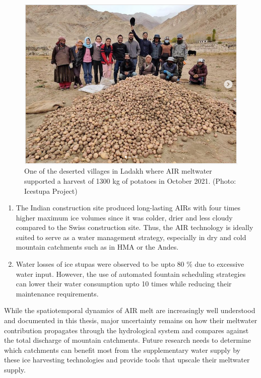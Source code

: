 \begin{figure}[htb]
  \centering
	\includegraphics[width=8 cm]{figs/Kullum_potatoes}
	\caption{One of the deserted villages in Ladakh where AIR meltwater supported a harvest of 1300 kg of
		potatoes in October 2021. (Photo: Icestupa Project)}
	\label{fig:kullum_potatoes}
\end{figure}

\begin{enumerate}

  \item The Indian construction site produced long-lasting \ac{AIRs} with four times higher maximum ice volumes
    since it was colder, drier and less cloudy compared to the Swiss construction site. Thus, the \ac{AIR}
    technology is ideally suited to serve as a water management strategy, especially in dry and cold mountain
    catchments such as in \ac{HMA} or the Andes.

  \item Water losses of ice stupas were observed to be upto 80 \% due to excessive water input. However, the use
    of automated fountain scheduling strategies can lower their water consumption upto 10 times while reducing
    their maintenance requirements.

\end{enumerate}

While the spatiotemporal dynamics of AIR melt are increasingly well understood and documented in this thesis,
major uncertainty remains on how their meltwater contribution propagates through the hydrological system and
compares against the total discharge of mountain catchments. Future research needs to determine which catchments
can benefit most from the supplementary water supply by these ice harvesting technologies and provide tools that
upscale their meltwater supply.

